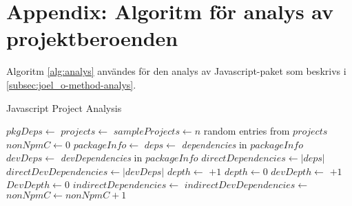 \section{Appendix: Algoritm för analys av projektberoenden}
\label{app:algorithm}

Algoritm \ref{alg:analys} användes för den analys av Javascript-paket som beskrivs i \ref{subsec:joel_o-method-analys}.

\begin{algorithm}[H]
\caption{Javascript Project Analysis} \label{alg:analys}
\begin{algorithmic}[1]
      \State \Return
    \EndIf
    \State
    \State $pkgDeps \gets$ 
    \State {}
    \State
      \State {}
    \EndFor
  \EndFunction
  \State
    \State $projects \gets $ 
    \State $sampleProjects \gets n$ random entries from $projects$
    \State
    \State $nonNpmC \gets 0$
        \State $packageInfo \gets $ 
        \State $deps \gets $ \textit{dependencies} in $packageInfo$
        \State $devDeps \gets $ \textit{devDependencies} in $packageInfo$
        \State
        \State {}
        \State
        \State $directDependencies \gets |deps|$
        \State $directDevDependencies \gets |devDeps|$
        \State
            \State{}
          \EndFor
          \State
          \State $depth \gets$  $+ 1$
        \Else
          \State $depth \gets 0$
        \EndIf
        \State
            \State {}
          \EndFor
          \State
          \State $devDepth \gets$  $+ 1$
        \Else
          \State $DevDepth \gets 0$
        \EndIf
        \State
        \State $indirectDependencies \gets$ 
        \State $indirectDevDependencies \gets$ 
        \State {}
      \Else
        \State $nonNpmC \gets nonNpmC + 1$
      \EndIf
    \EndFor
  \EndFunction
\end{algorithmic}
\end{algorithm}


